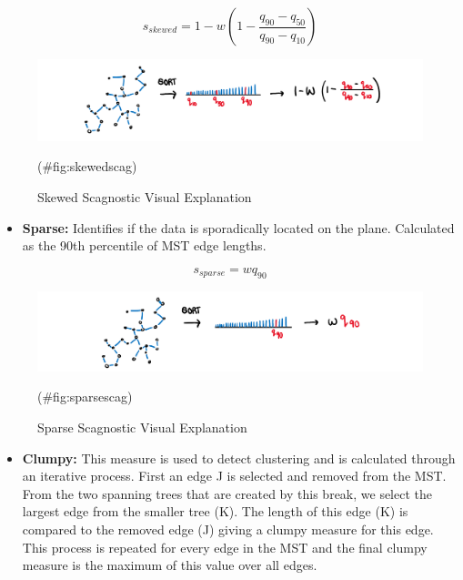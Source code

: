 \[s_{skewed} = 1-w(1-\frac{q_{90}-{q_{50}}}{q_{90}-q_{10}})\]

\begin{Schunk}
\begin{figure}
\includegraphics[width=1\linewidth,height=0.2\textheight]{figures/drawskewed} \caption[Skewed Scagnostic Visual Explanation]{Skewed Scagnostic Visual Explanation}(\#fig:skewedscag)
\end{figure}
\end{Schunk}

\begin{itemize}
\tightlist
\item
  \textbf{Sparse:} Identifies if the data is sporadically located on the
  plane. Calculated as the 90th percentile of MST edge lengths.
\end{itemize}

\[s_{sparse}= wq_{90}\]

\begin{Schunk}
\begin{figure}
\includegraphics[width=1\linewidth,height=0.2\textheight]{figures/drawsparse} \caption[Sparse Scagnostic Visual Explanation]{Sparse Scagnostic Visual Explanation}(\#fig:sparsescag)
\end{figure}
\end{Schunk}

\begin{itemize}
\tightlist
\item
  \textbf{Clumpy:} This measure is used to detect clustering and is
  calculated through an iterative process. First an edge J is selected
  and removed from the MST. From the two spanning trees that are created
  by this break, we select the largest edge from the smaller tree (K).
  The length of this edge (K) is compared to the removed edge (J) giving
  a clumpy measure for this edge. This process is repeated for every
  edge in the MST and the final clumpy measure is the maximum of this
  value over all edges.
\end{itemize}

